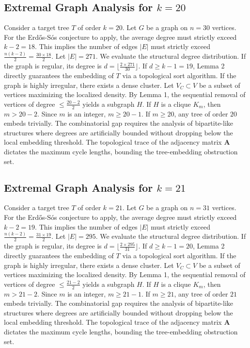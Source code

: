 \documentclass[11pt,a4paper]{article}
\begin{document}
\subsection{Extremal Graph Analysis for $k=20$}
Consider a target tree $T$ of order $k=20$.
Let $G$ be a graph on $n=30$ vertices.
For the Erd\H{o}s-S\'os conjecture to apply, the average degree must strictly exceed $k-2 = 18$.
This implies the number of edges $|E|$ must strictly exceed $\frac{n(k-2)}{2} = \frac{30 \times 18}{2}$.
Let $|E| = 271$.
We evaluate the structural degree distribution. If the graph is regular, its degree is $d = \lfloor \frac{2 \times 271}{30} \rfloor$.
If $d \geq k-1 = 19$, Lemma 2 directly guarantees the embedding of $T$ via a topological sort algorithm.
If the graph is highly irregular, there exists a dense cluster. Let $V_C \subset V$ be a subset of vertices maximizing the localized density.
By Lemma 1, the sequential removal of vertices of degree $\leq \frac{20-2}{2}$ yields a subgraph $H$.
If $H$ is a clique $K_{m}$, then $m > 20-2$. Since $m$ is an integer, $m \geq 20-1$. If $m \geq 20$, any tree of order $20$ embeds trivially.
The combinatorial gap requires the analysis of bipartite-like structures where degrees are artificially bounded without dropping below the local embedding threshold. The topological trace of the adjacency matrix $\mathbf{A}$ dictates the maximum cycle lengths, bounding the tree-embedding obstruction set.


\subsection{Extremal Graph Analysis for $k=21$}
Consider a target tree $T$ of order $k=21$.
Let $G$ be a graph on $n=31$ vertices.
For the Erd\H{o}s-S\'os conjecture to apply, the average degree must strictly exceed $k-2 = 19$.
This implies the number of edges $|E|$ must strictly exceed $\frac{n(k-2)}{2} = \frac{31 \times 19}{2}$.
Let $|E| = 295$.
We evaluate the structural degree distribution. If the graph is regular, its degree is $d = \lfloor \frac{2 \times 295}{31} \rfloor$.
If $d \geq k-1 = 20$, Lemma 2 directly guarantees the embedding of $T$ via a topological sort algorithm.
If the graph is highly irregular, there exists a dense cluster. Let $V_C \subset V$ be a subset of vertices maximizing the localized density.
By Lemma 1, the sequential removal of vertices of degree $\leq \frac{21-2}{2}$ yields a subgraph $H$.
If $H$ is a clique $K_{m}$, then $m > 21-2$. Since $m$ is an integer, $m \geq 21-1$. If $m \geq 21$, any tree of order $21$ embeds trivially.
The combinatorial gap requires the analysis of bipartite-like structures where degrees are artificially bounded without dropping below the local embedding threshold. The topological trace of the adjacency matrix $\mathbf{A}$ dictates the maximum cycle lengths, bounding the tree-embedding obstruction set.
\end{document}
